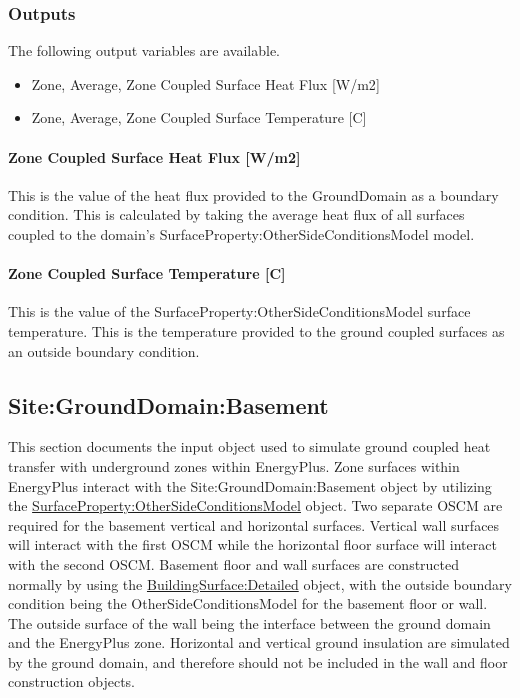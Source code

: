 \subsubsection{Outputs}\label{outputs-1-015}

The following output variables are available.

\begin{itemize}
\tightlist
\item
  Zone, Average, Zone Coupled Surface Heat Flux {[}W/m2{]}
\item
  Zone, Average, Zone Coupled Surface Temperature {[}C{]}
\end{itemize}

\paragraph{Zone Coupled Surface Heat Flux {[}W/m2{]}}\label{zone-coupled-surface-heat-flux-wm2}

This is the value of the heat flux provided to the GroundDomain as a boundary condition. This is calculated by taking the average heat flux of all surfaces coupled to the domain's SurfaceProperty:OtherSideConditionsModel model.

\paragraph{Zone Coupled Surface Temperature {[}C{]}}\label{zone-coupled-surface-temperature-c}

This is the value of the SurfaceProperty:OtherSideConditionsModel surface temperature. This is the temperature provided to the ground coupled surfaces as an outside boundary condition.

\subsection{Site:GroundDomain:Basement}\label{sitegrounddomainbasement}

This section documents the input object used to simulate ground coupled heat transfer with underground zones within EnergyPlus. Zone surfaces within EnergyPlus interact with the Site:GroundDomain:Basement object by utilizing the \hyperref[surfacepropertyothersideconditionsmodel]{SurfaceProperty:OtherSideConditionsModel} object. Two separate OSCM are required for the basement vertical and horizontal surfaces. Vertical wall surfaces will interact with the first OSCM while the horizontal floor surface will interact with the second OSCM. Basement floor and wall surfaces are constructed normally by using the \hyperref[buildingsurfacedetailed]{BuildingSurface:Detailed} object, with the outside boundary condition being the OtherSideConditionsModel for the basement floor or wall. The outside surface of the wall being the interface between the ground domain and the EnergyPlus zone. Horizontal and vertical ground insulation are simulated by the ground domain, and therefore should not be included in the wall and floor construction objects.

